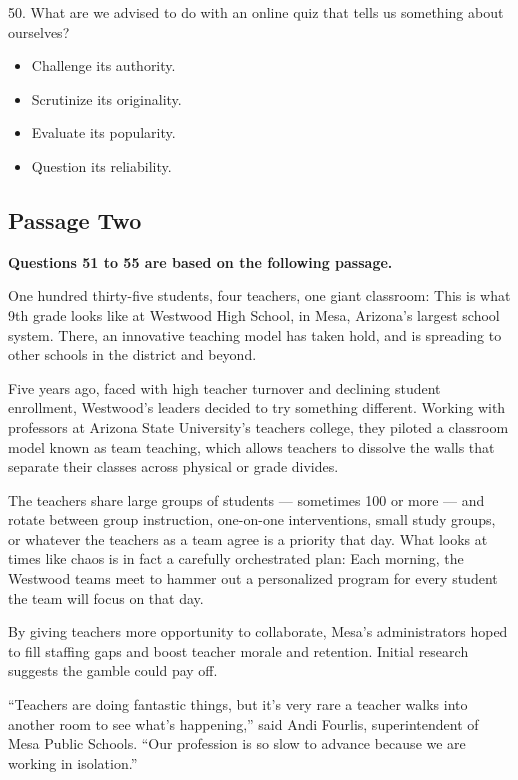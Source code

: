 \documentclass[UTF8,11pt]{ctexart}
\begin{document}
50. What are we advised to do with an online quiz that tells us something about ourselves?


\begin{itemize}[leftmargin=2em,itemsep=.2em,topsep=.4em]\item[A.] Challenge its authority.
\item[B.] Scrutinize its originality.
\item[C.] Evaluate its popularity.
\item[D.] Question its reliability.
\end{itemize}

\subsection*{\textbf{Passage Two}}


\textbf{Questions 51 to 55 are based on the following passage.}


One hundred thirty-five students, four teachers, one giant classroom: This is what 9th grade looks like at Westwood High School, in Mesa, Arizona’s largest school system. There, an innovative teaching model has taken hold, and is spreading to other schools in the district and beyond.


Five years ago, faced with high teacher turnover and declining student enrollment, Westwood’s leaders decided to try something different. Working with professors at Arizona State University’s teachers college, they piloted a classroom model known as team teaching, which allows teachers to dissolve the walls that separate their classes across physical or grade divides.


The teachers share large groups of students — sometimes 100 or more — and rotate between group instruction, one-on-one interventions, small study groups, or whatever the teachers as a team agree is a priority that day. What looks at times like chaos is in fact a carefully orchestrated plan: Each morning, the Westwood teams meet to hammer out a personalized program for every student the team will focus on that day.


By giving teachers more opportunity to collaborate, Mesa’s administrators hoped to fill staffing gaps and boost teacher morale and retention. Initial research suggests the gamble could pay off.


“Teachers are doing fantastic things, but it’s very rare a teacher walks into another room to see what’s happening,” said Andi Fourlis, superintendent of Mesa Public Schools. “Our profession is so slow to advance because we are working in isolation.”
\end{document}
